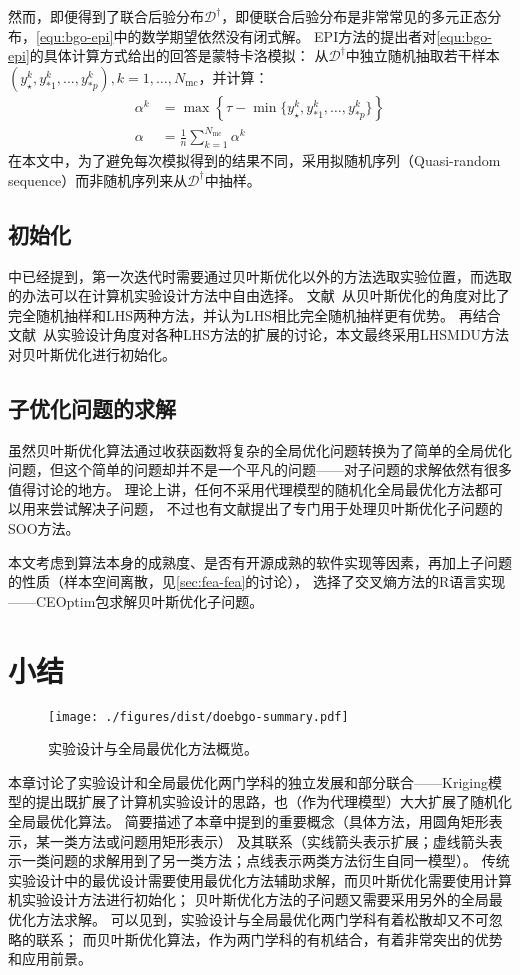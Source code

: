 \documentclass[index]{subfiles}
\begin{document}
然而，即便得到了联合后验分布$\mathcal{D}^\dag$，即便联合后验分布是非常常见的多元正态分布，\cref{equ:bgo-epi}中的数学期望依然没有闭式解。
EPI方法的提出者对\cref{equ:bgo-epi}的具体计算方式给出的回答是蒙特卡洛模拟\cite{clark2012}：
从$\mathcal{D}^\dag$中独立随机抽取若干样本$\left(y_\star^k, y_{\ast 1}^k,\ldots,y_{\ast p}^k\right), k=1,\ldots,N_\mathrm{mc}$，并计算：
\begin{align}\label{equ:bgo-mc}
  \alpha^k &= \max\!\left\{\tau - \min\{y_\star^k, y_{\ast 1}^k,\ldots,y_{\ast p}^k\}\right\} \\
  \alpha &= \frac{1}{n}\sum_{k=1}^{N_\mathrm{mc}}\alpha^k
\end{align}
在本文中，为了避免每次模拟得到的结果不同，采用拟随机序列（Quasi-random sequence）而非随机序列来从$\mathcal{D}^\dag$中抽样。

\subsection{初始化}\label{ssec:bgo-init}
中已经提到，第一次迭代时需要通过贝叶斯优化以外的方法选取实验位置，而选取的办法可以在计算机实验设计方法中自由选择。
文献~从贝叶斯优化的角度对比了完全随机抽样和LHS两种方法，并认为LHS相比完全随机抽样更有优势。
再结合文献~从实验设计角度对各种LHS方法的扩展的讨论，本文最终采用LHSMDU方法对贝叶斯优化进行初始化。

\subsection{子优化问题的求解}\label{ssec:bgo-sub}
虽然贝叶斯优化算法通过收获函数将复杂的全局优化问题转换为了简单的全局优化问题，但这个简单的问题却并不是一个平凡的问题——对子问题的求解依然有很多值得讨论的地方。
理论上讲，任何不采用代理模型的随机化全局最优化方法都可以用来尝试解决子问题，
不过也有文献提出了专门用于处理贝叶斯优化子问题的SOO方法\cite{munos2011}。

本文考虑到算法本身的成熟度、是否有开源成熟的软件实现等因素，再加上子问题的性质（样本空间离散，见\cref{sec:fea-fea}的讨论），
选择了交叉熵方法的R语言实现——CEOptim包\cite{benham2015}求解贝叶斯优化子问题。

\section{小结}
\begin{figure}[h]
  \centering
  \texttt{[image: ./figures/dist/doebgo-summary.pdf]}
  \caption[实验设计与全局最优化方法概览]{实验设计与全局最优化方法概览。\label{fig:doebgo-summary}}
\end{figure}
本章讨论了实验设计和全局最优化两门学科的独立发展和部分联合——Kriging模型的提出既扩展了计算机实验设计的思路，也（作为代理模型）大大扩展了随机化全局最优化算法。
简要描述了本章中提到的重要概念（具体方法，用圆角矩形表示，某一类方法或问题用矩形表示）
及其联系（实线箭头表示扩展；虚线箭头表示一类问题的求解用到了另一类方法；点线表示两类方法衍生自同一模型）。
传统实验设计中的最优设计需要使用最优化方法辅助求解，而贝叶斯优化需要使用计算机实验设计方法进行初始化；
贝叶斯优化方法的子问题又需要采用另外的全局最优化方法求解。
可以见到，实验设计与全局最优化两门学科有着松散却又不可忽略的联系；
而贝叶斯优化算法，作为两门学科的有机结合，有着非常突出的优势和应用前景。
\end{document}
